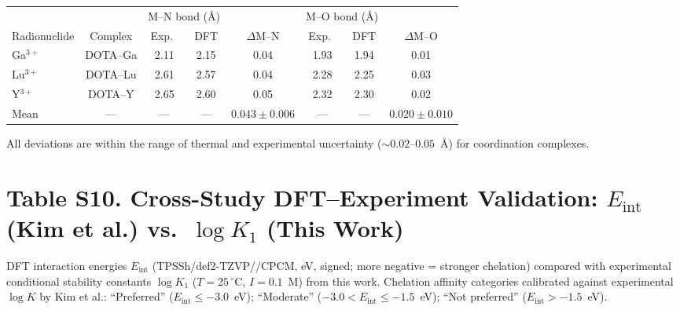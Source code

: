 \documentclass[journal=jacsat,manuscript=suppinfo]{achemso}
\begin{document}
\begin{table}[h!]
  \centering
  \begin{tabular}{@{}lccccccc@{}}
    \toprule
    & & \multicolumn{2}{c}{M--N bond (\AA)} & &
      \multicolumn{2}{c}{M--O bond (\AA)} & \\
    \cmidrule(lr){3-4}\cmidrule(lr){6-7}
    Radionuclide & Complex &
      Exp.\ & DFT & $\Delta$M--N &
      Exp.\ & DFT & $\Delta$M--O \\
    \midrule
    Ga$^{3+}$ & DOTA--Ga & 2.11 & 2.15 & 0.04 & 1.93 & 1.94 & 0.01 \\
    Lu$^{3+}$ & DOTA--Lu & 2.61 & 2.57 & 0.04 & 2.28 & 2.25 & 0.03 \\
    Y$^{3+}$  & DOTA--Y  & 2.65 & 2.60 & 0.05 & 2.32 & 2.30 & 0.02 \\
    \midrule
    Mean & --- & --- & --- & $0.043 \pm 0.006$ &
                --- & --- & $0.020 \pm 0.010$ \\
    \bottomrule
  \end{tabular}
\end{table}

All deviations are within the range of thermal and experimental uncertainty
($\sim 0.02$--$0.05$~\AA) for coordination complexes.\cite{Kim2026molpharm}

\newpage

\section*{Table S10. Cross-Study DFT--Experiment Validation:
$E_\mathrm{int}$ (Kim et al.) vs.\ $\log K_1$ (This Work)}
\label{tab:s10}

DFT interaction energies $E_\mathrm{int}$ (TPSSh/def2-TZVP//CPCM, eV, signed;
more negative = stronger chelation\cite{Kim2026molpharm}) compared with
experimental conditional stability constants $\log K_1$ ($T = 25\,^\circ$C,
$I = 0.1$~M) from this work.
Chelation affinity categories calibrated against experimental $\log K$ by
Kim et al.\cite{Kim2026molpharm}:
``Preferred'' ($E_\mathrm{int} \leq -3.0$~eV);
``Moderate'' ($-3.0 < E_\mathrm{int} \leq -1.5$~eV);
``Not preferred'' ($E_\mathrm{int} > -1.5$~eV).
\end{document}
